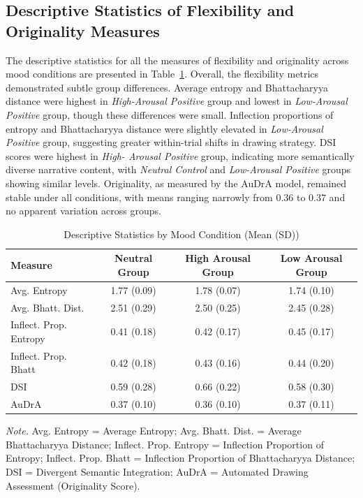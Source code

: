 \documentclass[../MA_Thesis.tex]{subfiles}
\begin{document}
\subsection*{Descriptive Statistics of Flexibility and Originality Measures}

The descriptive statistics for all the measures of flexibility and originality across mood conditions are presented in Table~\ref{tab:descriptive_stats}. Overall, the flexibility metrics demonstrated subtle group differences. Average entropy and Bhattacharyya distance were highest in \textit{High-Arousal Positive} group and lowest in \textit{Low-Arousal Positive} group, though these differences were small. Inflection proportions of entropy and Bhattacharyya distance were slightly elevated in \textit{Low-Arousal Positive} group, suggesting greater within-trial shifts in drawing strategy. DSI scores were highest in \textit{High- Arousal Positive} group, indicating more semantically diverse narrative content, with \textit{Neutral Control} and \textit{Low-Arousal Positive} groups showing similar levels. Originality, as measured by the AuDrA model, remained stable under all conditions, with means ranging narrowly from 0.36 to 0.37 and no apparent variation across groups. 

\begin{table}[H]
\centering
\begin{threeparttable}
\caption{Descriptive Statistics by Mood Condition (Mean (SD))}
\label{tab:descriptive_stats}
\begin{tabular}{lccc}
\toprule
\textbf{Measure} & \textbf{Neutral Group} & \textbf{High Arousal Group} & \textbf{Low Arousal Group} \\
\midrule
Avg. Entropy & 1.77 (0.09) & 1.78 (0.07) & 1.74 (0.10) \\
Avg. Bhatt. Dist. & 2.51 (0.29) & 2.50 (0.25) & 2.45 (0.28) \\
Inflect. Prop. Entropy & 0.41 (0.18) & 0.42 (0.17) & 0.45 (0.17) \\
Inflect. Prop. Bhatt & 0.42 (0.18) & 0.43 (0.16) & 0.44 (0.20) \\
DSI & 0.59 (0.28) & 0.66 (0.22) & 0.58 (0.30) \\
AuDrA & 0.37 (0.10) & 0.36 (0.10) & 0.37 (0.11) \\
\bottomrule
\end{tabular}
\begin{tablenotes}[flushleft]
\small
\item \textit{Note.} Avg. Entropy = Average Entropy; Avg. Bhatt. Dist. = Average Bhattacharyya Distance; Inflect. Prop. Entropy = Inflection Proportion of Entropy; Inflect. Prop. Bhatt = Inflection Proportion of Bhattacharyya Distance; DSI = Divergent Semantic Integration; AuDrA = Automated Drawing Assessment (Originality Score).
\end{tablenotes}
\end{threeparttable}
\end{table}
\end{document}
